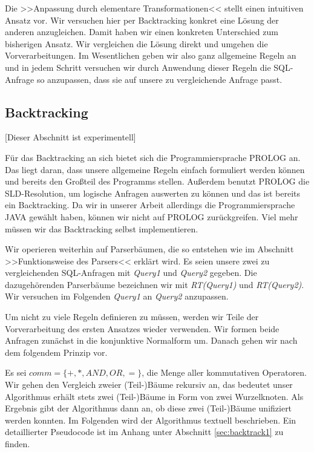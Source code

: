 Die >>Anpassung durch elementare Transformationen<< stellt einen intuitiven Ansatz vor. Wir versuchen hier per Backtracking konkret eine Lösung der anderen anzugleichen. Damit haben wir einen konkreten Unterschied zum bisherigen Ansatz. Wir vergleichen die Lösung direkt und umgehen die Vorverarbeitungen. Im Wesentlichen geben wir also ganz allgemeine Regeln an und in jedem Schritt versuchen wir durch Anwendung dieser Regeln die SQL-Anfrage so anzupassen, dass sie auf unsere zu vergleichende Anfrage passt.

\subsection{Backtracking}

[Dieser Abschnitt ist experimentell]

Für das Backtracking an sich bietet sich die Programmiersprache PROLOG an. Das liegt daran, dass unsere allgemeine Regeln einfach formuliert werden können und bereits den Großteil des Programms stellen. Außerdem benutzt PROLOG die SLD-Resolution, um logische Anfragen auswerten zu können und das ist bereits ein Backtracking. Da wir in unserer Arbeit allerdings die Programmiersprache JAVA gewählt haben, können wir nicht auf PROLOG zurückgreifen. Viel mehr müssen wir das Backtracking selbst implementieren. 

Wir operieren weiterhin auf Parserbäumen, die so entstehen wie im Abschnitt >>Funktionsweise des Parsers<< erklärt wird. Es seien unsere zwei zu vergleichenden SQL-Anfragen mit \textit{Query1} und \textit{Query2} gegeben. Die dazugehörenden Parserbäume bezeichnen wir mit \textit{RT(Query1)} und \textit{RT(Query2)}. Wir versuchen im Folgenden \textit{Query1} an \textit{Query2} anzupassen.

Um nicht zu viele Regeln definieren zu müssen, werden wir Teile der Vorverarbeitung des ersten Ansatzes wieder verwenden. Wir formen beide Anfragen zunächst in die konjunktive Normalform um. Danach gehen wir nach dem folgendem Prinzip vor.

Es sei $\mathit{comm} = \{+,*,AND,OR,=\}$, die Menge aller kommutativen Operatoren. Wir gehen den Vergleich zweier (Teil-)Bäume rekursiv an, das bedeutet unser Algorithmus erhält stets zwei (Teil-)Bäume in Form von zwei Wurzelknoten. Als Ergebnis gibt der Algorithmus dann an, ob diese zwei (Teil-)Bäume unifiziert werden konnten. Im Folgenden wird der Algorithmus textuell beschrieben. Ein detaillierter Pseudocode ist im Anhang unter Abschnitt \ref{sec:backtrack1} zu finden.


